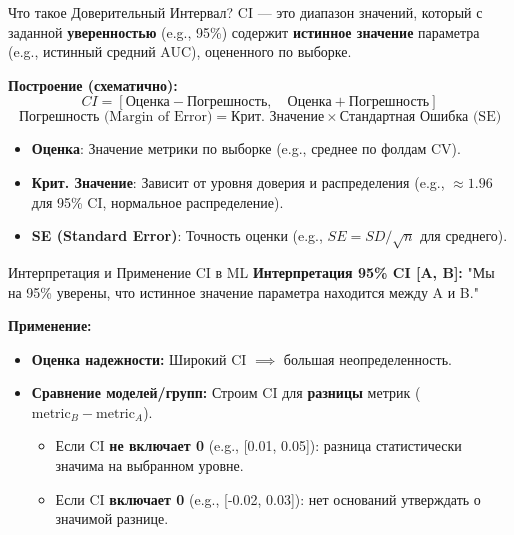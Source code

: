 \begin{textbox}{Что такое Доверительный Интервал?}
    CI — это диапазон значений, который с заданной \textbf{уверенностью} (e.g., 95\%) содержит \textbf{истинное значение} параметра (e.g., истинный средний AUC), оцененного по выборке.

    \textbf{Построение (схематично):}
    \[ CI = [\text{Оценка} - \text{Погрешность}, \quad \text{Оценка} + \text{Погрешность}] \]
    \[ \text{Погрешность (Margin of Error)} = \text{Крит. Значение} \times \text{Стандартная Ошибка (SE)} \]
    \begin{itemize}[nosep, leftmargin=*]
        \item \textbf{Оценка}: Значение метрики по выборке (e.g., среднее по фолдам CV).
        \item \textbf{Крит. Значение}: Зависит от уровня доверия и распределения (e.g., $\approx 1.96$ для 95\% CI, нормальное распределение).
        \item \textbf{SE (Standard Error)}: Точность оценки (e.g., $SE = SD/\sqrt{n}$ для среднего).
    \end{itemize}
\end{textbox}

\begin{textbox}{Интерпретация и Применение CI в ML}
    \textbf{Интерпретация 95\% CI [A, B]:} "Мы на 95\% уверены, что истинное значение параметра находится между A и B."

    \textbf{Применение:}
    \begin{itemize}[nosep, leftmargin=*]
        \item \textbf{Оценка надежности:} Широкий CI $\implies$ большая неопределенность.
        \item \textbf{Сравнение моделей/групп:} Строим CI для \textbf{разницы} метрик ($\text{metric}_B - \text{metric}_A$).
            \begin{itemize}
                \item Если CI \textbf{не включает 0} (e.g., [0.01, 0.05]): разница статистически значима на выбранном уровне.
                \item Если CI \textbf{включает 0} (e.g., [-0.02, 0.03]): нет оснований утверждать о значимой разнице.
            \end{itemize}
    \end{itemize}
\end{textbox}

